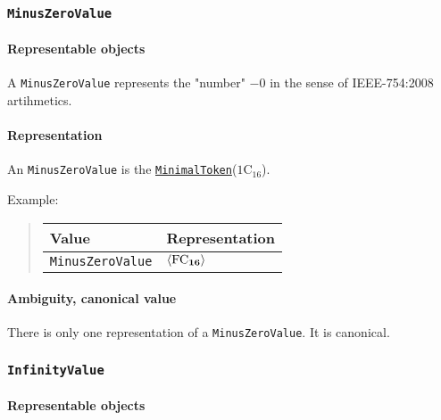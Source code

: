 \documentclass[headings=normal, headsepline, numbers=noenddot, fleqn, a4paper]{scrartcl}
\newcommand{\HexNumber}[1]{\mathrm{#1}_{16}}
\newcommand{\DborSyntaxIdent}[1]{\texttt{#1}}
\newcommand{\DborSyntaxIdentRef}[1]{\hyperlink{sec:def:#1}{\DborSyntaxIdent{#1}}}
\newcommand{\DborFirstByte}[2]{\mathbf{\textcolor{#1}{\HexNumber{#2}}}}
\newcommand{\DborFirstByteNumber}[1]{\DborFirstByte{black}{#1}}
\begin{document}
    \subsubsection{\DborSyntaxIdent{MinusZeroValue}}
    \label{sec:def:MinusZeroValue}
    \hypertarget{sec:def:MinusZeroValue}{}

    \paragraph{Representable objects}

    A \DborSyntaxIdent{MinusZeroValue} represents the "number" $-0$ in the sense of IEEE-754:2008 artihmetics.

    \paragraph{Representation}

    An \DborSyntaxIdent{MinusZeroValue} is the \DborSyntaxIdentRef{MinimalToken}($\HexNumber{1C}$).

    \smallskip
    \noindent
    Example:
    \nolinebreak
    \begin{quote}    
        \begin{tabular}{ll}
            \toprule
            Value & Representation \\
            \midrule
            \DborSyntaxIdent{MinusZeroValue} 
                & $\langle \DborFirstByteNumber{FC} \rangle$ \\
            \bottomrule
        \end{tabular}
    \end{quote}

    \paragraph{Ambiguity, canonical value}

    There is only one representation of a \DborSyntaxIdent{MinusZeroValue}.
    It is canonical.


    \subsubsection{\DborSyntaxIdent{InfinityValue}}
    \label{sec:def:InfinityValue}
    \hypertarget{sec:def:InfinityValue}{}

    \paragraph{Representable objects}
\end{document}
